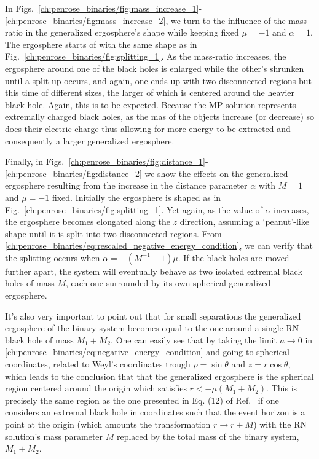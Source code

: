 In Figs.~\ref{ch:penrose_binaries/fig:mass_increase_1}-\ref{ch:penrose_binaries/fig:mass_increase_2}, we turn to the influence of the mass-ratio in the generalized ergosphere's shape while keeping fixed $\mu = -1$ and $\alpha = 1$. The ergosphere starts of with the same shape as in Fig.~\ref{ch:penrose_binaries/fig:splitting_1}. As the mass-ratio increases, the ergosphere around one of the black holes is enlarged while the other's shrunken until a split-up occurs, and again, one ends up with two disconnected regions but this time of different sizes, the larger of which is centered around the heavier black hole. Again, this is to be expected. Because the MP solution represents extremally charged black holes, as the mas of the objects increase (or decrease) so does their electric charge thus allowing for more energy to be extracted and consequently a larger generalized ergosphere.

Finally, in Figs.~\ref{ch:penrose_binaries/fig:distance_1}-\ref{ch:penrose_binaries/fig:distance_2} we show the effects on the generalized ergosphere resulting from the increase in the distance parameter $\alpha$ with $M=1$ and $\mu=-1$ fixed. Initially the ergosphere is shaped as in Fig.~\ref{ch:penrose_binaries/fig:splitting_1}. Yet again, as the value of $\alpha$ increases, the ergosphere becomes elongated along the $z$ direction, assuming a `peanut'-like shape until it is split into two disconnected regions. From \eqref{ch:penrose_binaries/eq:rescaled_negative_energy_condition}, we can verify that the splitting occurs when $\alpha = -(M^{-1}+1)\mu$. If the black holes are moved further apart, the system will eventually behave as two isolated extremal black holes of mass $M$, each one surrounded by its own spherical generalized ergosphere.

It's also very important to point out that for small separations the generalized ergosphere of the binary system becomes equal to the one around a single RN black hole of mass $M_1 + M_2$. One can easily see that by taking the limit $a \rightarrow 0$ in \eqref{ch:penrose_binaries/eq:negative_energy_condition} and going to spherical coordinates, related to Weyl's coordinates trough $\rho = \sin\theta$ and $z=r\cos\theta$, which leads to the conclusion that that the generalized ergosphere is the spherical region centered around the origin which satisfies $r < -\mu (M_1 + M_2).$ This is precisely the same region as the one presented in Eq. (12) of Ref.~\cite{DENARDO1973} if one considers an extremal black hole in coordinates such that the event horizon is a point at the origin (which amounts the transformation $r \rightarrow r + M$) with the RN solution's mass parameter $M$ replaced by the total mass of the binary system, $M_1 + M_2$.

